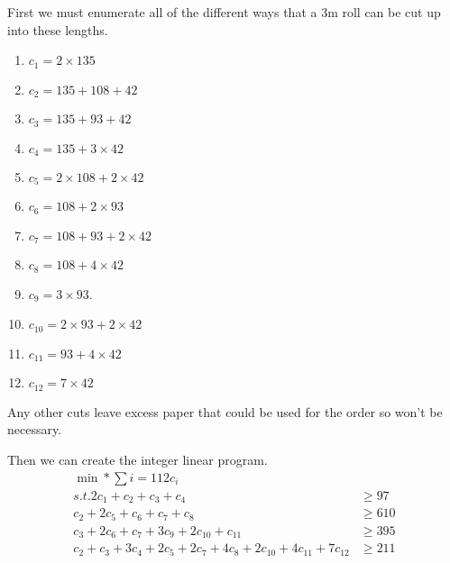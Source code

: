 \documentclass[11pt, oneside]{article}
\begin{document}
\begin{enumerate}
        First we must enumerate all of the different ways that a 3m roll can be
        cut up into these lengths.
        \begin{enumerate}
            \item $c_1 = 2 \times 135$
            \item $c_2 = 135 + 108 + 42$
            \item $c_3 = 135 + 93 + 42$
            \item $c_4 = 135 + 3 \times 42$
            \item $c_5 = 2 \times 108 + 2 \times 42$
            \item $c_6 = 108 + 2 \times 93$
            \item $c_7 = 108 + 93 + 2 \times 42$
            \item $c_8 = 108 + 4 \times 42$
            \item $c_9 = 3 \times 93$.
            \item $c_{10} = 2 \times 93 + 2 \times 42$
            \item $c_{11} = 93 + 4 \times 42$
            \item $c_{12} = 7 \times 42$
        \end{enumerate}
        Any other cuts leave excess paper that could be used for the order so
        won't be necessary.

        Then we can create the integer linear program.
        \begin{align*}
            \min* \sum{i = 1}{12}{c_i} \\
            s.t. 
            2c_1 + c_2 + c_3 + c_4 &\ge 97 \\
            c_2 + 2c_5 + c_6 + c_7 + c_8 &\ge 610 \\
            c_3 + 2 c_6 + c_7 + 3c_9 + 2c_{10} + c_{11} &\ge 395 \\
            c_2 + c_3 + 3c_4 + 2c_5 + 2c_7 + 4c_8 + 2c_{10} + 4c_{11} + 7c_{12} &\ge 211
        \end{align*}



\end{enumerate}
\end{document}
